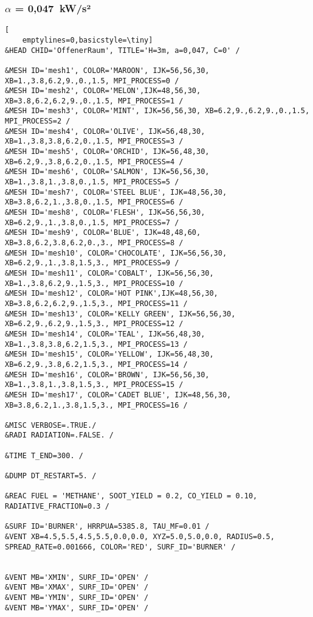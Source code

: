 \subsubsection{$\alpha$ = 0,047~kW/s²}
\begin{lstlisting}[
    emptylines=0,basicstyle=\tiny]
&HEAD CHID='OffenerRaum', TITLE='H=3m, a=0,047, C=0' /

&MESH ID='mesh1', COLOR='MAROON', IJK=56,56,30, XB=1.,3.8,6.2,9.,0.,1.5, MPI_PROCESS=0 /
&MESH ID='mesh2', COLOR='MELON',IJK=48,56,30, XB=3.8,6.2,6.2,9.,0.,1.5, MPI_PROCESS=1 /
&MESH ID='mesh3', COLOR='MINT', IJK=56,56,30, XB=6.2,9.,6.2,9.,0.,1.5, MPI_PROCESS=2 /
&MESH ID='mesh4', COLOR='OLIVE', IJK=56,48,30, XB=1.,3.8,3.8,6.2,0.,1.5, MPI_PROCESS=3 /
&MESH ID='mesh5', COLOR='ORCHID', IJK=56,48,30, XB=6.2,9.,3.8,6.2,0.,1.5, MPI_PROCESS=4 /
&MESH ID='mesh6', COLOR='SALMON', IJK=56,56,30, XB=1.,3.8,1.,3.8,0.,1.5, MPI_PROCESS=5 /
&MESH ID='mesh7', COLOR='STEEL BLUE', IJK=48,56,30, XB=3.8,6.2,1.,3.8,0.,1.5, MPI_PROCESS=6 /
&MESH ID='mesh8', COLOR='FLESH', IJK=56,56,30, XB=6.2,9.,1.,3.8,0.,1.5, MPI_PROCESS=7 /
&MESH ID='mesh9', COLOR='BLUE', IJK=48,48,60, XB=3.8,6.2,3.8,6.2,0.,3., MPI_PROCESS=8 /
&MESH ID='mesh10', COLOR='CHOCOLATE', IJK=56,56,30, XB=6.2,9.,1.,3.8,1.5,3., MPI_PROCESS=9 /
&MESH ID='mesh11', COLOR='COBALT', IJK=56,56,30, XB=1.,3.8,6.2,9.,1.5,3., MPI_PROCESS=10 /
&MESH ID='mesh12', COLOR='HOT PINK',IJK=48,56,30, XB=3.8,6.2,6.2,9.,1.5,3., MPI_PROCESS=11 /
&MESH ID='mesh13', COLOR='KELLY GREEN', IJK=56,56,30, XB=6.2,9.,6.2,9.,1.5,3., MPI_PROCESS=12 /
&MESH ID='mesh14', COLOR='TEAL', IJK=56,48,30, XB=1.,3.8,3.8,6.2,1.5,3., MPI_PROCESS=13 /
&MESH ID='mesh15', COLOR='YELLOW', IJK=56,48,30, XB=6.2,9.,3.8,6.2,1.5,3., MPI_PROCESS=14 /
&MESH ID='mesh16', COLOR='BROWN', IJK=56,56,30, XB=1.,3.8,1.,3.8,1.5,3., MPI_PROCESS=15 /
&MESH ID='mesh17', COLOR='CADET BLUE', IJK=48,56,30, XB=3.8,6.2,1.,3.8,1.5,3., MPI_PROCESS=16 /

&MISC VERBOSE=.TRUE./
&RADI RADIATION=.FALSE. /

&TIME T_END=300. /

&DUMP DT_RESTART=5. /

&REAC FUEL = 'METHANE', SOOT_YIELD = 0.2, CO_YIELD = 0.10, RADIATIVE_FRACTION=0.3 /

&SURF ID='BURNER', HRRPUA=5385.8, TAU_MF=0.01 /
&VENT XB=4.5,5.5,4.5,5.5,0.0,0.0, XYZ=5.0,5.0,0.0, RADIUS=0.5, SPREAD_RATE=0.001666, COLOR='RED', SURF_ID='BURNER' /


&VENT MB='XMIN', SURF_ID='OPEN' /  
&VENT MB='XMAX', SURF_ID='OPEN' /  
&VENT MB='YMIN', SURF_ID='OPEN' /  
&VENT MB='YMAX', SURF_ID='OPEN' / 
 

\end{lstlisting}
